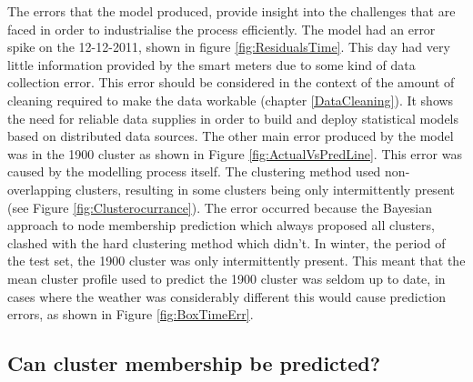 The errors that the model produced, provide insight into the challenges that are faced in order to industrialise the process efficiently. The model had an error spike on the 12-12-2011,  shown in figure
\ref{fig:ResidualsTime}. This day had very little information provided by the smart meters due to some kind of data collection error. This error should be considered in the context of the amount of cleaning required to make the data workable (chapter \ref{DataCleaning}). It shows the need for reliable data supplies in order to build and deploy statistical models based on distributed data sources. The other main error produced by the model was in the 1900 cluster as shown in Figure \ref{fig:ActualVsPredLine}. This error was caused by the modelling process itself. The clustering method used non-overlapping clusters, resulting in some clusters being only intermittently present (see Figure \ref{fig:Clusterocurrance}). The error occurred because the Bayesian approach to node membership prediction which always proposed all clusters, clashed with the hard clustering method which didn't. In winter, the period of the test set, the 1900 cluster was only intermittently present. This meant that the mean cluster profile used to predict the 1900 cluster was seldom up to date, in cases where the weather was considerably different this would cause prediction errors, as shown in Figure \ref{fig:BoxTimeErr}.

\subsection{Can cluster membership be predicted?}

